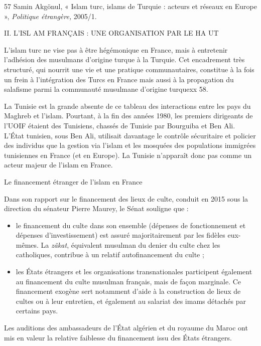 57 Samin Akgönul, « Islam turc, islams de Turquie : acteurs et réseaux
en Europe », \emph{Politique étrangère,} 2005/1.

II. L'ISL AM FRANÇAIS : UNE ORGANISATION PAR LE HA UT

L'islam turc ne vise pas à être hégémonique en France, mais à entretenir
l'adhésion des musulmans d'origine turque à la Turquie. Cet encadrement
très structuré, qui nourrit une vie et une pratique communautaires,
constitue à la fois un frein à l'intégration des Turcs en France mais
aussi à la propagation du salafisme parmi la communauté musulmane
d'origine turquexx 58.

La Tunisie est la grande absente de ce tableau des interactions entre
les pays du Maghreb et l'islam. Pourtant, à la fin des années 1980, les
premiers dirigeants de l'UOIF étaient des Tunisiens, chassés de Tunisie
par Bourguiba et Ben Ali. L'État tunisien, sous Ben Ali, utilisait
davantage le contrôle sécuritaire et policier des individus que la
gestion via l'islam et les mosquées des populations immigrées
tunisiennes en France (et en Europe). La Tunisie n'apparaît donc pas
comme un acteur majeur de l'islam en France.


Le financement étranger de l'islam en France


Dans son rapport sur le financement des lieux de culte, conduit en 2015
sous la direction du sénateur Pierre Maurey, le Sénat souligne que :


\begin{itemize}
\item
  le financement du culte dans son ensemble (dépenses de fonctionnement
  et dépenses d'investissement) est assuré majoritairement par les
  fidèles eux- mêmes. La \emph{zâkat}, équivalent musulman du denier du
  culte chez les catholiques, contribue à un relatif autofinancement du
  culte ;
\item
  
  les États étrangers et les organisations transnationales participent
  également au financement du culte musulman français, mais de façon
  marginale. Ce financement exogène sert notamment d'aide à la
  construction de lieux de cultes ou à leur entretien, et également au
  salariat des imams détachés par certains pays.
  
\end{itemize}


Les auditions des ambassadeurs de l'État algérien et du royaume du Maroc
ont mis en valeur la relative faiblesse du financement issu des États
étrangers.

